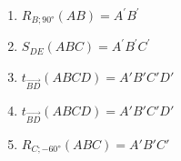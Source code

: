 \begin{enumerate}
\begin{center}
          \end{center}
    \item $R_{B;\ang{90}}\left( AB \right) = A^{'}B^{'}$
          \begin{center}
            
          \end{center}
          \newpage
    \item $S_{DE}\left( ABC \right) = A^{'}B^{'}C^{'}$
          \begin{center}
            
          \end{center}
    \item $t_{\overrightarrow{BD}}\left( ABCD \right) = A'B'C'D'$
          \begin{center}
            
          \end{center}
    \item $t_{\overrightarrow{BD}}\left( ABCD \right) = A'B'C'D'$
          \begin{center}
            
          \end{center}
          \newpage
    \item $R_{C; \ang{-60}}\left( ABC \right) = A'B'C'$
          \begin{center}
            
          \end{center}
  \end{enumerate}
